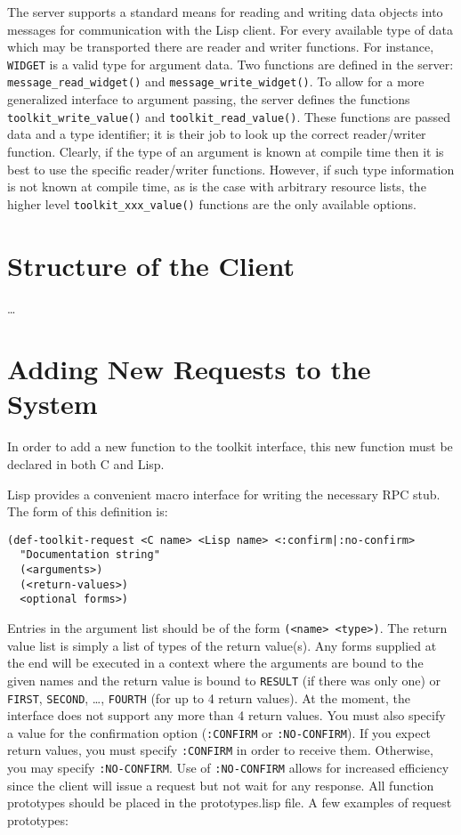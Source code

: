 \documentclass{article}
\begin{document}
The server supports a standard means for reading and writing data
objects into messages for communication with the Lisp client.  For
every available type of data which may be transported there are reader
and writer functions.  For instance, \texttt{WIDGET} is a valid type
for argument data.  Two functions are defined in the server:
\texttt{message\_read\_widget()} and
\texttt{message\_write\_widget()}. To allow for a more generalized
interface to argument passing, the server defines the functions
\texttt{toolkit\_write\_value()} and \texttt{toolkit\_read\_value()}.
These functions are passed data and a type identifier; it is their job
to look up the correct reader/writer function.  Clearly, if the type
of an argument is known at compile time then it is best to use the
specific reader/writer functions.  However, if such type information
is not known at compile time, as is the case with arbitrary resource
lists, the higher level \texttt{toolkit\_xxx\_value()} functions are
the only available options.


\section{Structure of the Client}

\ldots





\section{Adding New Requests to the System}

In order to add a new function to the toolkit interface, this new
function must be declared in both C and Lisp.

Lisp provides a convenient macro interface for writing the necessary RPC
stub.  The form of this definition is:

\begin{verbatim}
(def-toolkit-request <C name> <Lisp name> <:confirm|:no-confirm>
  "Documentation string"
  (<arguments>)
  (<return-values>)
  <optional forms>)
\end{verbatim}

Entries in the argument list should be of the form \texttt{(<name>
<type>)}.  The return value list is simply a list of types of the
return value(s).  Any forms supplied at the end will be executed in a
context where the arguments are bound to the given names and the
return value is bound to \texttt{RESULT} (if there was only one) or
\texttt{FIRST}, \texttt{SECOND}, \ldots, \texttt{FOURTH} (for up to 4
return values).  At the moment, the interface does not support any
more than 4 return values.  You must also specify a value for the
confirmation option (\texttt{:CONFIRM} or \texttt{:NO-CONFIRM}).  If
you expect return values, you must specify \texttt{:CONFIRM} in order
to receive them.  Otherwise, you may specify \texttt{:NO-CONFIRM}.
Use of \texttt{:NO-CONFIRM} allows for increased efficiency since the
client will issue a request but not wait for any response.  All
function prototypes should be placed in the prototypes.lisp file.  A
few examples of request prototypes:
\end{document}
